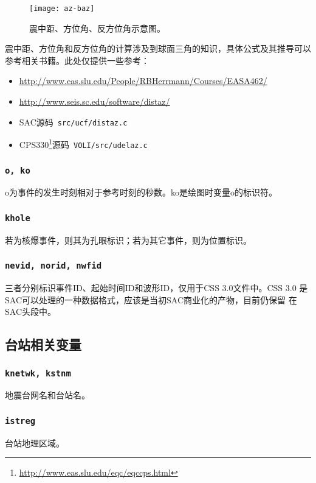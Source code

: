 \begin{figure}[H]
\centering
\texttt{[image: az-baz]}
\caption[震中距、方位角、反方位角示意图]{震中距、方位角、反方位角示意图。}
\label{fig:gcarc-dist-az-baz}
\end{figure}

震中距、方位角和反方位角的计算涉及到球面三角的知识，具体公式及其推导可以参考相关书籍。此处仅提供一些参考：

\begin{itemize}
\item \url{http://www.eas.slu.edu/People/RBHerrmann/Courses/EASA462/}
\item \url{http://www.seis.sc.edu/software/distaz/}
\item SAC源码~\verb+src/ucf/distaz.c+
\item CPS330\footnote{\url{http://www.eas.slu.edu/eqc/eqccps.html}}源码~\verb+VOLI/src/udelaz.c+
\end{itemize}

\subsubsection{\texttt{o, ko}}
o为事件的发生时刻相对于参考时刻的秒数。ko是绘图时变量o的标识符。

\subsubsection{\texttt{khole}}
若为核爆事件，则其为孔眼标识；若为其它事件，则为位置标识。

\subsubsection{\texttt{nevid, norid, nwfid}}
三者分别标识事件ID、起始时间ID和波形ID，仅用于CSS 3.0文件中。CSS 3.0
是SAC可以处理的一种数据格式，应该是当初SAC商业化的产物，目前仍保留
在SAC头段中。

\subsection{台站相关变量}
\subsubsection{\texttt{knetwk, kstnm}}
地震台网名和台站名。

\subsubsection{\texttt{istreg}\dag}
台站地理区域。

